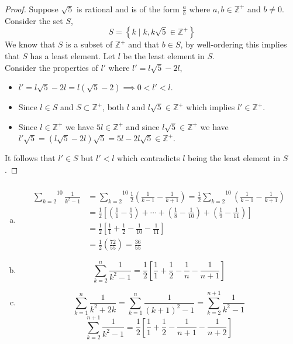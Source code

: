 \documentclass[class=article, crop=false]{standalone}
\def\inlinesum#1#2{\overset{#2}{\underset{#1}{\sum}}}
\begin{document}
\subsubsection{}
\begin{proof}
	Suppose $\sqrt{5}$ is rational and is of the form $\frac{a}{b}$ where $a,b\in\mathbb{Z}^+$ and $b\neq 0$.
	Consider the set $S$,
	$$S = \left\{ k \mid k, k\sqrt{5}\in\mathbb{Z}^+ \right\}$$
	We know that $S$ is a subset of $\mathbb{Z}^+$ and that $b\in S$, by well-ordering this implies that $S$ has a least element.
	Let $l$ be the least element in $S$.\\
	Consider the properties of $l'$ where $l' = l\sqrt{5}-2l$,
	\begin{itemize}
	  \item $l'=l\sqrt{5}-2l= l(\sqrt{5}-2) \implies 0 < l' < l$.
	  \item Since $l\in S$ and $S\subset \mathbb{Z}^+$, both $l \text{ and }l\sqrt{5}\in\mathbb{Z}^+$ which implies $l'\in\mathbb{Z}^+$.
	  \item Since $l\in\mathbb{Z}^+$ we have $5l\in\mathbb{Z}^+$ and since $l\sqrt{5}\in\mathbb{Z}^+$ we have $l'\sqrt{5}= (l\sqrt{5}-2l)\sqrt{5}= 5l-2l\sqrt{5}\in\mathbb{Z}^+$.
	\end{itemize}
	It follows that $l'\in S$ but $l' < l$ which contradicts $l$ being the least element in $S$.
  \end{proof}
\subsubsection{}
\begin{enumerate}[(a)]
  \item
	\begin{align*}
	  \inlinesum{k=2}{10}\frac{1}{k^2-1} &=\inlinesum{k=2}{10}\frac{1}{2}\left(\frac{1}{k-1}-\frac{1}{k+1}\right)= \frac{1}{2}\inlinesum{k=2}{10}\left(\frac{1}{k-1}-\frac{1}{k+1}\right) \\
	  &= \frac{1}{2}\left[\left(\frac{1}{1}-\frac{1}{3}\right) + \cdots + \left(\frac{1}{8}-\frac{1}{10}\right) + \left(\frac{1}{9}-\frac{1}{11}\right)\right] \\
	  &= \frac{1}{2}\left[\frac{1}{1} + \frac{1}{2} - \frac{1}{10} - \frac{1}{11}\right] \\
	  &= \frac{1}{2}\left(\frac{72}{55}\right) = \frac{36}{55}
	\end{align*}

  \item
	$$\inlinesum{k=2}{n}\frac1{k^2-1}= \frac{1}{2}\left[\frac{1}{1}+\frac{1}{2} - \frac{1}{n} - \frac{1}{n+1}\right]$$

  \item
	$$\inlinesum{k=1}{n} \frac{1}{k^2+2k} = \inlinesum{k=1}{n}\frac{1}{(k+1)^2 - 1} = \inlinesum{k=2}{n+1}\frac{1}{k^2 - 1}$$
	$$\inlinesum{k=2}{n+1}\frac{1}{k^2 - 1} = \frac{1}{2} \left[\frac{1}{1} + \frac{1}{2} - \frac{1}{n+1} - \frac{1}{n+2}\right]$$

  \end{enumerate}
\end{document}
